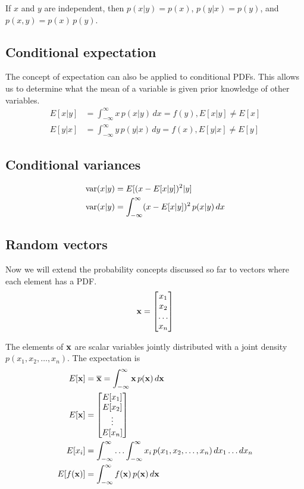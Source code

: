 If $x$ and $y$ are independent, then $p(x|y) = p(x)$, $p(y|x) = p(y)$, and
$p(x, y) = p(x) \,p(y)$.

\subsection{Conditional expectation}

The concept of expectation can also be applied to conditional PDFs. This allows
us to determine what the mean of a variable is given prior knowledge of other
variables.
\begin{align*}
  E[x|y] &= \int_{-\infty}^\infty x \,p(x|y) \,dx = f(y), E[x|y] \neq E[x] \\
  E[y|x] &= \int_{-\infty}^\infty y \,p(y|x) \,dy = f(x), E[y|x] \neq E[y]
\end{align*}

\subsection{Conditional variances}
\begin{align*}
  \operatorname{var}(x|y) &= E[(x - E[x|y])^2|y] \\
  \operatorname{var}(x|y) &= \int_{-\infty}^\infty (x - E[x|y])^2 \,p(x|y) \,dx
\end{align*}

\subsection{Random vectors}

Now we will extend the probability concepts discussed so far to vectors where
each element has a PDF.
\begin{equation*}
  \mathbf{x} = \begin{bmatrix}
    x_1 \\
    x_2 \\
    \ldots \\
    x_n
  \end{bmatrix}
\end{equation*}

The elements of $\mathbf{x}$ are scalar variables jointly distributed with a joint
density $p(x_1, x_2, \ldots, x_n)$. The expectation is
\begin{align*}
  E[\mathbf{x}] &= \overline{\mathbf{x}} = \int_{-\infty}^\infty \mathbf{x} \,p(\mathbf{x})
    \,d\mathbf{x} \\
  E[\mathbf{x}] &= \begin{bmatrix}
    E[x_1] \\
    E[x_2] \\
    \vdots \\
    E[x_n]
  \end{bmatrix} \\
  E[x_i] &= \int_{-\infty}^\infty \ldots \int_{-\infty}^\infty x_i
    \,p(x_1, x_2, \ldots, x_n) \,dx_1 \ldots dx_n \\
  E[f(\mathbf{x})] &= \int_{-\infty}^\infty f(\mathbf{x}) \,p(\mathbf{x}) \,d\mathbf{x}
\end{align*}

